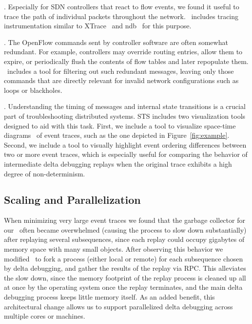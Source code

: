 . Especially for SDN controllers that react to
flow events, we found it useful to trace the path of individual
packets throughout the network. \projectname~includes tracing instrumentation
similar
to XTrace~\cite{fonseca2007x} and ndb~\cite{ndb14} for this
purpose.

. The OpenFlow commands sent by controller software
are often somewhat redundant. For example, controllers may override routing
entries, allow them to expire, or periodically flush the
contents of flow tables and later repopulate them. \projectname~includes a
tool for filtering out such redundant messages,
leaving only those commands that are directly relevant for invalid network
configurations such as loops or blackholes.

. Understanding the timing of messages and internal
state transitions is a crucial part of troubleshooting distributed systems.
STS includes two visualization tools designed to aid with this task. First, we
include a tool to visualize space-time diagrams~\cite{Lamport:1978:TCO:359545.359563}
of event traces, such as the one depicted in Figure~\ref{fig:example}.
Second, we include a tool to visually highlight event ordering differences
between two or more event traces, which is especially useful for comparing the behavior of
intermediate delta debugging replays when the original trace exhibits a high degree of non-determinism.

\subsection{Scaling and Parallelization}

When minimizing very large event traces we found that the garbage collector
for our \tester~often became overwhelmed (causing the process to slow down
substantially) after replaying several subsequences, since each replay could
occupy gigabytes of memory space with many small objects.
After observing this behavior we modified \projectname~to fork a process
(either local or remote) for each subsequence chosen by delta debugging,
and gather the results of the replay via RPC. This alleviates the slow down,
since the memory footprint of the replay process is cleaned up all at once by the
operating system once the
replay terminates, and the
main delta debugging process keeps little memory itself.
As an added benefit, this architectural change allows us to support
parallelized delta debugging across multiple cores or machines.

